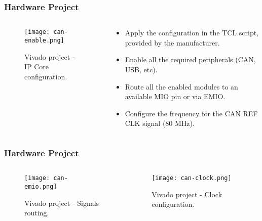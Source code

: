 \begin{frame}
	\frametitle{Hardware Project}
	\begin{columns}
		\begin{column}{0.5\textwidth}
			\begin{figure}
				\texttt{[image: can-enable.png]}
				\caption{Vivado project - IP Core configuration.}\label{fig:can-enable}
			\end{figure}
		\end{column}
		\begin{column}{0.5\textwidth}
			\begin{itemize}
				\item Apply the configuration in the TCL script, provided by the manufacturer.
				\item Enable all the required peripherals (CAN, USB, etc).
				\item Route all the enabled modules to an available MIO pin or via EMIO.
				\item Configure the frequency for the CAN REF CLK signal (80 MHz).
			\end{itemize}
		\end{column}
	\end{columns}
\end{frame}

\begin{frame}
	\frametitle{Hardware Project}
	\begin{columns}
		\begin{column}{0.5\textwidth}
			\begin{figure}
				\texttt{[image: can-emio.png]}
				\caption{Vivado project - Signals routing.}\label{fig:can-emio}
			\end{figure}
		\end{column}
		\begin{column}{0.5\textwidth}
			\begin{figure}
				\texttt{[image: can-clock.png]}
				\caption{Vivado project - Clock configuration.}\label{fig:can-clock}
			\end{figure}
		\end{column}
	\end{columns}
\end{frame}


